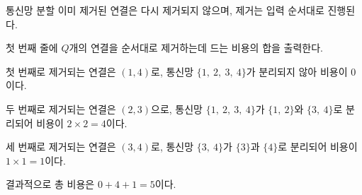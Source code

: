 \begin{problem}{통신망 분할}
    이미 제거된 연결은 다시 제거되지 않으며, 제거는 입력 순서대로 진행된다.
    
    
    \OutputFile
    첫 번째 줄에 $ Q $개의 연결을 순서대로 제거하는데 드는 비용의 합을 출력한다.
    
    \Examples
    
    \begin{example}
    \end{example}
        
    \Explanation
    첫 번째로 제거되는 연결은 $ (1, 4) $로, 통신망 $ \{1,\ 2,\ 3,\ 4\} $가 분리되지 않아 비용이 0이다.
    
    두 번째로 제거되는 연결은 $ (2, 3) $으로, 통신망 $ \{1,\ 2,\ 3,\ 4\} $가 $ \{1,\ 2\} $와 $ \{3,\ 4\} $로 분리되어 비용이 $ 2 \times 2 = 4 $이다.
    
    세 번째로 제거되는 연결은 $ (3, 4) $로, 통신망 $ \{3,\ 4\} $가 $ \{3\} $과 $ \{4\} $로 분리되어 비용이 $ 1 \times 1 = 1 $이다.
    
    결과적으로 총 비용은 $ 0 + 4 + 1 = 5 $이다.
    
\end{problem}

